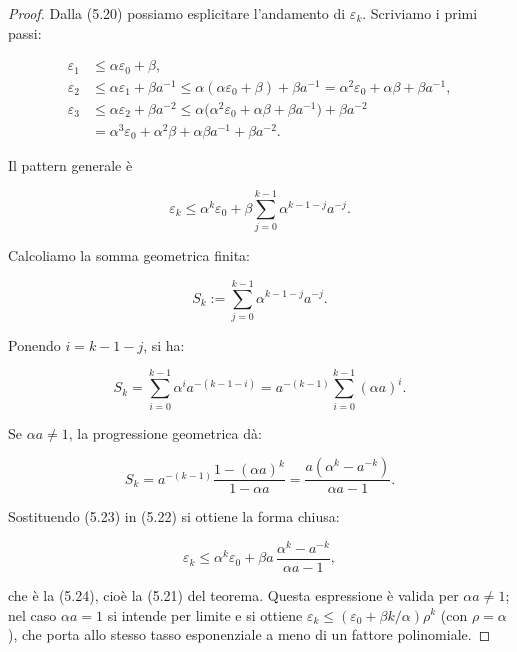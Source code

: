 \documentclass[a4paper,12pt]{article}
\numberwithin{equation}{section}
\numberwithin{figure}{section}
\numberwithin{table}{section}
\begin{document}
\begin{proof}


Dalla (5.20) possiamo esplicitare l'andamento di $\varepsilon_k$. Scriviamo i primi passi:

\begin{align*}
\varepsilon_1 &\le \alpha \varepsilon_0 + \beta, \\
\varepsilon_2 &\le \alpha \varepsilon_1 + \beta a^{-1}
\le \alpha(\alpha \varepsilon_0 + \beta)+\beta a^{-1}
= \alpha^2 \varepsilon_0 + \alpha\beta + \beta a^{-1}, \\
\varepsilon_3 &\le \alpha \varepsilon_2 + \beta a^{-2}
\le \alpha\bigl(\alpha^2 \varepsilon_0 + \alpha\beta + \beta a^{-1}\bigr) + \beta a^{-2} \\
&= \alpha^3 \varepsilon_0 + \alpha^2\beta + \alpha\beta a^{-1} + \beta a^{-2}.
\end{align*}

Il pattern generale è

\begin{equation}
\varepsilon_k \le \alpha^k \varepsilon_0 + \beta \sum_{j=0}^{k-1} \alpha^{k-1-j} a^{-j}. \tag{5.22}
\end{equation}

Calcoliamo la somma geometrica finita:

\[
S_k := \sum_{j=0}^{k-1} \alpha^{k-1-j} a^{-j}.
\]

Ponendo $i = k-1-j$, si ha:

\[
S_k = \sum_{i=0}^{k-1} \alpha^{i} a^{-(k-1-i)}
= a^{-(k-1)} \sum_{i=0}^{k-1} (\alpha a)^i.
\]

Se $\alpha a \neq 1$, la progressione geometrica dà:

\begin{equation}
S_k = a^{-(k-1)} \frac{1 - (\alpha a)^k}{1 - \alpha a}
= \frac{a(\alpha^k - a^{-k})}{\alpha a - 1}. \tag{5.23}
\end{equation}

Sostituendo (5.23) in (5.22) si ottiene la forma chiusa:

\begin{equation}
\varepsilon_k \le \alpha^k \varepsilon_0 + \beta a\,\frac{\alpha^k - a^{-k}}{\alpha a - 1}, \tag{5.24}
\end{equation}

che è la (5.24), cioè la (5.21) del teorema. Questa espressione è valida per $\alpha a \neq 1$; nel caso $\alpha a = 1$ si intende per limite e si ottiene $\varepsilon_k \le (\varepsilon_0 + \beta k/\alpha)\rho^k$ (con $\rho = \alpha$), che porta allo stesso tasso esponenziale a meno di un fattore polinomiale.


\end{proof}
\end{document}
